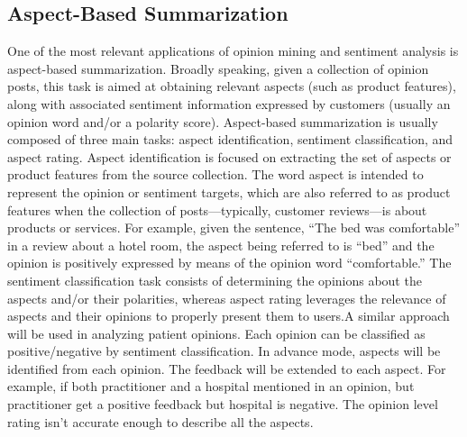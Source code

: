 \documentclass[10pt,twocolumn]{article}
\begin{document}
\subsection{Aspect-Based Summarization}
One of the most relevant applications of opinion mining and sentiment analysis is aspect-based summarization. Broadly speaking, given a collection of opinion posts, this task is aimed at obtaining relevant aspects (such as product features), along with associated sentiment information expressed by customers (usually an opinion word and/or a polarity score). Aspect-based summarization is usually composed of three main tasks: aspect identification, sentiment classification, and aspect rating. Aspect identification is focused on extracting the set of aspects or product features from the source collection. The word aspect is intended to represent the opinion or sentiment targets, which are also referred to as product features when the collection of posts—typically, customer reviews—is about products or services. For example, given the sentence, “The bed was comfortable” in a review about a hotel room, the aspect being referred to is “bed” and the opinion is positively expressed by means of the opinion word “comfortable.” The sentiment classification task consists of determining the opinions about the aspects and/or their polarities, whereas aspect rating leverages the relevance of aspects and their opinions to properly present them to users.\cite{ref11}A similar approach will be used in analyzing patient opinions. Each opinion can be classified as positive/negative by sentiment classification. In advance mode, aspects will be identified from each opinion. The feedback will be extended to each aspect. For example, if both practitioner and a hospital mentioned in an opinion, but practitioner get a positive feedback but hospital is negative. The opinion level rating isn’t accurate enough to describe all the aspects.
\end{document}
